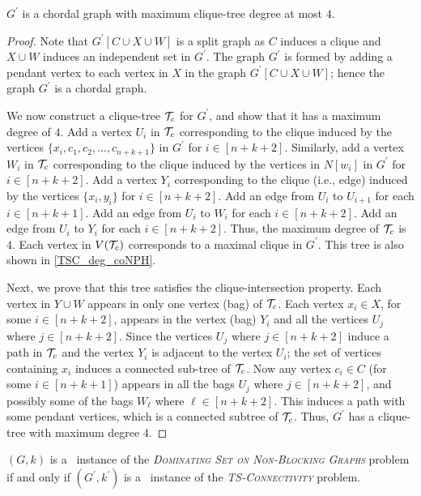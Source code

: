 \begin{lemma}
$G^\prime$ is a chordal graph with maximum clique-tree degree at most $4$.
\end{lemma}
\begin{proof}
Note that $G^\prime[C\cup X\cup W]$ is a split graph as 
$C$ induces a clique and $X\cup W$ induces an independent set 
in $G^\prime$. 
The graph $G^\prime$ is formed by adding a pendant vertex 
to each vertex in $X$ in the graph $G^\prime[C\cup X\cup W]$;
hence the graph $G^\prime$ is a chordal graph. 

We now construct a clique-tree $\mathcal{T}_c$ for $G^\prime$, 
and show that it has a maximum degree of $4$. 
Add a vertex $U_i$ in $\mathcal{T}_c$ corresponding to the clique 
induced by the vertices $\{x_i,c_1,c_2,\ldots,c_{n+k+1}\}$ 
in $G^\prime$ for $i \in [n+k+2]$. 
Similarly, add a vertex $W_i$ in $\mathcal{T}_c$ corresponding 
to the clique induced by the vertices in $N[w_i]$ in $G^\prime$ 
for $i\in [n+k+2]$. 
Add a vertex $Y_i$ corresponding to the clique (i.e., edge) induced 
by the vertices $\{x_i,y_i\}$ for $i\in[n+k+2]$. 
Add an edge from $U_i$ to $U_{i+1}$ for each $i\in [n+k+1]$. 
Add an edge from $U_i$ to $W_i$ for each $i\in [n+k+2]$.
Add an edge from $U_i$ to $Y_i$ for each $i\in [n+k+2]$. 
Thus, the maximum degree of $\mathcal{T}_c$ is $4$. 
Each vertex in $V(\mathcal{T}_c)$ corresponds to a maximal clique in $G^\prime$.
This tree is also shown in \cref{TSC_deg_coNPH}.

Next, we prove that this tree satisfies the clique-intersection property.
Each vertex in $Y\cup W$ appears in only one vertex (bag) of $\mathcal{T}_c$.
Each vertex $x_i\in X$, for some $i \in [n+k+2]$, 
appears in the vertex (bag) $Y_i$ and all the vertices $U_j$ 
where $j\in [n+k+2]$. 
Since the vertices $U_j$ where $j\in [n+k+2]$ induce a path in 
$\mathcal{T}_c$ and the vertex $Y_i$ is adjacent to the vertex $U_i$;
the set of vertices containing $x_i$ induces a connected sub-tree of 
$\mathcal{T}_c$. 
Now any vertex $c_i\in C$ (for some $i\in [n+k+1]$) appears 
in all the bags $U_j$ where $j\in [n+k+2]$, and possibly some 
of the bags $W_\ell$ where $\ell\in [n+k+2]$.
This induces a path with some pendant vertices, 
which is a connected subtree of $\mathcal{T}_c$. 
Thus, $G^\prime$ has a clique-tree with maximum degree $4$.
\end{proof}
\begin{lemma}
\label{lemma:TS-conn-max-deg}
$(G,k)$ is a \yes\ instance of the
\emph{\textsc{Dominating Set on Non-Blocking Graphs}} 
problem if and only if $(G^\prime,k^\prime)$ is a \no\ instance of the
\emph{\textsc{TS-Connectivity}} problem. 
\end{lemma}
